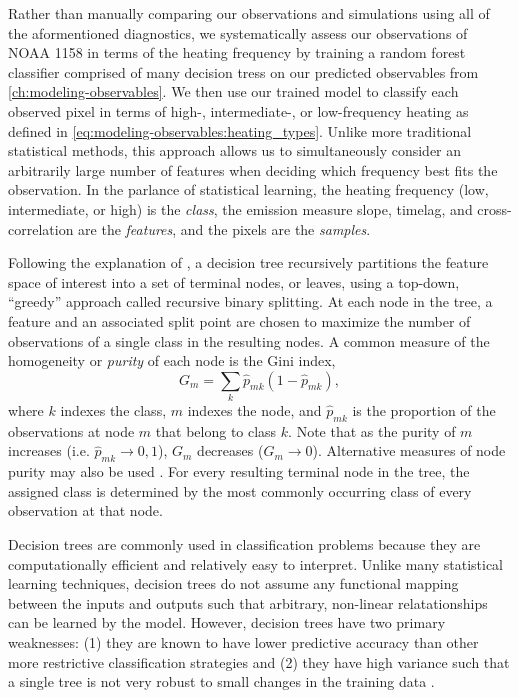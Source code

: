 Rather than manually comparing our observations and simulations using all of the aformentioned diagnostics, we systematically assess our observations of NOAA 1158 in terms of the heating frequency by training a random forest classifier comprised of many decision tress on our predicted observables from \autoref{ch:modeling-observables}. We then use our trained model to classify each observed pixel in terms of high-, intermediate-, or low-frequency heating as defined in \autoref{eq:modeling-observables:heating_types}. Unlike more traditional statistical methods, this approach allows us to simultaneously consider an arbitrarily large number of features when deciding which frequency best fits the observation. In the parlance of statistical learning, the heating frequency (low, intermediate, or high) is the \textit{class}, the emission measure slope, timelag, and cross-correlation are the \textit{features}, and the pixels are the \textit{samples}.

Following the explanation of \citet[chapter 8]{james_introduction_2013}, a decision tree recursively partitions the feature space of interest into a set of terminal nodes, or leaves, using a top-down, ``greedy'' approach called recursive binary splitting. At each node in the tree, a feature and an associated split point are chosen to maximize the number of observations of a single class in the resulting nodes. A common measure of the homogeneity or \textit{purity} of each node is the Gini index,
\begin{equation}\label{eq:classifying-observables:gini-index}
    G_m = \sum_k \hat{p}_{mk} (1 - \hat{p}_{mk}),
\end{equation}
where $k$ indexes the class, $m$ indexes the node, and $\hat{p}_{mk}$ is the proportion of the observations at node $m$ that belong to class $k$. Note that as the purity of $m$ increases (i.e. $\hat{p}_{mk}\to0,1$), $G_m$ decreases ($G_m\to0$). Alternative measures of node purity may also be used \citep[see section 9.2.3 of][]{hastie_elements_2009}. For every resulting terminal node in the tree, the assigned class is determined by the most commonly occurring class of every observation at that node.

Decision trees are commonly used in classification problems because they are computationally efficient and relatively easy to interpret. Unlike many statistical learning techniques, decision trees do not assume any functional mapping between the inputs and outputs such that arbitrary, non-linear relatationships can be learned by the model. However, decision trees have two primary weaknesses: (1) they are known to have lower predictive accuracy than other more restrictive classification strategies and (2) they have high variance such that a single tree is not very robust to small changes in the training data \citep{james_introduction_2013}.

